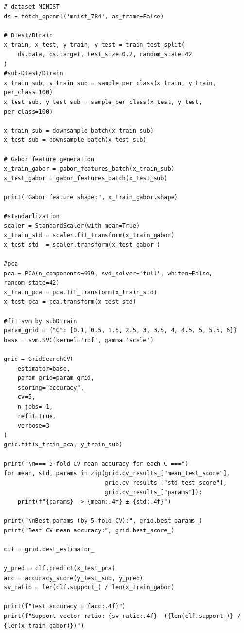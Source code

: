 \documentclass[11pt, reqno, letterpaper, twoside]{amsart}
\theoremstyle{plain}
\theoremstyle{definition}
\begin{document}
\begin{lstlisting}
# dataset MINIST
ds = fetch_openml('mnist_784', as_frame=False)

# Dtest/Dtrain
x_train, x_test, y_train, y_test = train_test_split(
    ds.data, ds.target, test_size=0.2, random_state=42
)
#sub-Dtest/Dtrain
x_train_sub, y_train_sub = sample_per_class(x_train, y_train, per_class=100)
x_test_sub, y_test_sub = sample_per_class(x_test, y_test, per_class=100)

x_train_sub = downsample_batch(x_train_sub)   
x_test_sub = downsample_batch(x_test_sub)

# Gabor feature generation
x_train_gabor = gabor_features_batch(x_train_sub)    
x_test_gabor = gabor_features_batch(x_test_sub)

print("Gabor feature shape:", x_train_gabor.shape)

#standarlization
scaler = StandardScaler(with_mean=True)        
x_train_std = scaler.fit_transform(x_train_gabor)
x_test_std  = scaler.transform(x_test_gabor )

#pca
pca = PCA(n_components=999, svd_solver='full', whiten=False, random_state=42)
x_train_pca = pca.fit_transform(x_train_std)
x_test_pca = pca.transform(x_test_std)

#fit svm by subDtrain
param_grid = {"C": [0.1, 0.5, 1.5, 2.5, 3, 3.5, 4, 4.5, 5, 5.5, 6]}  
base = svm.SVC(kernel='rbf', gamma='scale')

grid = GridSearchCV(
    estimator=base,
    param_grid=param_grid,
    scoring="accuracy",
    cv=5,       
    n_jobs=-1,
    refit=True,   
    verbose=3
)
grid.fit(x_train_pca, y_train_sub)

print("\n=== 5-fold CV mean accuracy for each C ===")
for mean, std, params in zip(grid.cv_results_["mean_test_score"],
                             grid.cv_results_["std_test_score"],
                             grid.cv_results_["params"]):
    print(f"{params} -> {mean:.4f} ± {std:.4f}")

print("\nBest params (by 5-fold CV):", grid.best_params_)
print("Best CV mean accuracy:", grid.best_score_)

clf = grid.best_estimator_

y_pred = clf.predict(x_test_pca)
acc = accuracy_score(y_test_sub, y_pred)
sv_ratio = len(clf.support_) / len(x_train_gabor) 

print(f"Test accuracy = {acc:.4f}")
print(f"Support vector ratio: {sv_ratio:.4f}  ({len(clf.support_)} / {len(x_train_gabor)})")
\end{lstlisting}
\end{document}
